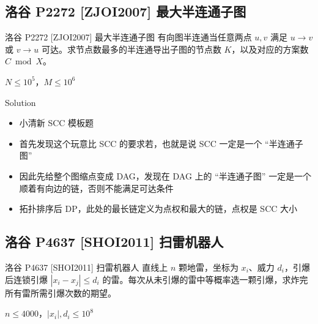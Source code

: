 ﻿\documentclass[aspectratio=169]{ctexbeamer}
\begin{document}
\subsection{洛谷 P2272 [ZJOI2007] 最大半连通子图}

\begin{frame}{洛谷 P2272 [ZJOI2007] 最大半连通子图}
      有向图半连通当任意两点 $u,v$ 满足 $u\to v$ 或 $v\to u$ 可达。求节点数最多的半连通导出子图的节点数 $K$，以及对应的方案数 $C\bmod X$。
      
      $N\le 10^5$，$M\le 10^6$
\end{frame}

\begin{frame}{Solution}
    \begin{itemize}
        \item 小清新 SCC 模板题
        \item 首先发现这个玩意比 SCC 的要求若，也就是说 SCC 一定是一个 “半连通子图”
        \item 因此先给整个图缩点变成 DAG，发现在 DAG 上的 “半连通子图” 一定是一个顺着有向边的链，否则不能满足可达条件
        \item 拓扑排序后 DP，此处的最长链定义为点权和最大的链，点权是 SCC 大小
    \end{itemize}    
\end{frame}










\subsection{洛谷 P4637 [SHOI2011] 扫雷机器人}

\begin{frame}{洛谷 P4637 [SHOI2011] 扫雷机器人}
      直线上 $n$ 颗地雷，坐标为 $x_i$、威力 $d_i$，引爆后连锁引爆 $|x_i-x_j|\le d_i$ 的雷。每次从未引爆的雷中等概率选一颗引爆，求炸完所有雷所需引爆次数的期望。
      
      $n\le 4000$，$|x_i|,d_i\le 10^8$
\end{frame}
\end{document}
